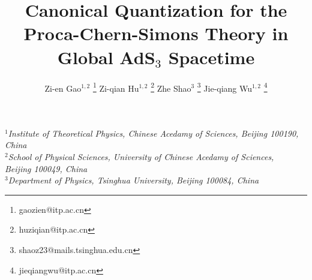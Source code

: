 \title{\textbf{Canonical Quantization for the Proca-Chern-Simons Theory in Global AdS$_3$ Spacetime}}

\author{
Zi-en Gao${}^{1,2}$ \footnote{gaozien@itp.ac.cn}
Zi-qian Hu${}^{1,2}$ \footnote{huziqian@itp.ac.cn}
Zhe Shao${}^{3}$ \footnote{shaoz23@mails.tsinghua.edu.cn}
Jie-qiang Wu${}^{1,2}$ \footnote{jieqiangwu@itp.ac.cn}
}

\date{}

\maketitle

\begin{center}
{\it
$^{1}$Institute of Theoretical Physics, Chinese Acedamy of Sciences, Beijing 100190, China \\
$^{2}$School of Physical Sciences, University of Chinese Acedamy of Sciences, \\ Beijing 100049, China\\
$^{3}$Department of Physics, Tsinghua University, Beijing 100084, China
}
\end{center}

\vspace{10mm}
